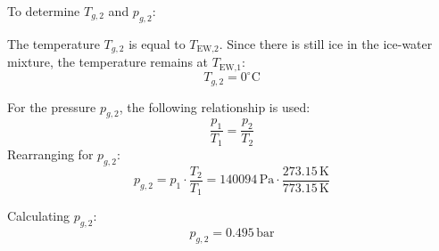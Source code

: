 To determine \( T_{g,2} \) and \( p_{g,2} \):  

The temperature \( T_{g,2} \) is equal to \( T_{\text{EW,2}} \). Since there is still ice in the ice-water mixture, the temperature remains at \( T_{\text{EW,1}} \):  
\[
T_{g,2} = 0^\circ\text{C}
\]  

For the pressure \( p_{g,2} \), the following relationship is used:  
\[
\frac{p_1}{T_1} = \frac{p_2}{T_2}
\]  
Rearranging for \( p_{g,2} \):  
\[
p_{g,2} = p_1 \cdot \frac{T_2}{T_1} = 140094 \, \text{Pa} \cdot \frac{273.15 \, \text{K}}{773.15 \, \text{K}}
\]  

Calculating \( p_{g,2} \):  
\[
p_{g,2} = 0.495 \, \text{bar}
\]